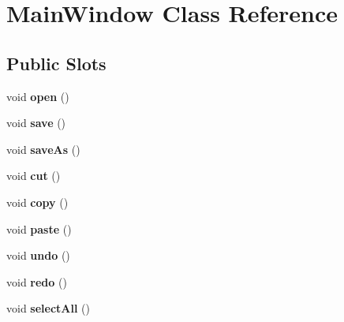 \hypertarget{class_main_window}{
\section{MainWindow Class Reference}
\label{class_main_window}
}
\subsection*{Public Slots}
\begin{DoxyCompactItemize}
\item 
\hypertarget{class_main_window_aa7473e4bbbcc281706ac2edef864fb45}{
void {\bfseries open} ()}
\label{class_main_window_aa7473e4bbbcc281706ac2edef864fb45}

\item 
\hypertarget{class_main_window_a3ba1a371fb10e731ae0926ae85efeb4f}{
void {\bfseries save} ()}
\label{class_main_window_a3ba1a371fb10e731ae0926ae85efeb4f}

\item 
\hypertarget{class_main_window_a7fbef0054cdec7bbbf3c06fb12af473c}{
void {\bfseries saveAs} ()}
\label{class_main_window_a7fbef0054cdec7bbbf3c06fb12af473c}

\item 
\hypertarget{class_main_window_a03fc263176d1b53aeaca24606c11a7b4}{
void {\bfseries cut} ()}
\label{class_main_window_a03fc263176d1b53aeaca24606c11a7b4}

\item 
\hypertarget{class_main_window_acf6d6b4fec2a84de7ec6645260c061fa}{
void {\bfseries copy} ()}
\label{class_main_window_acf6d6b4fec2a84de7ec6645260c061fa}

\item 
\hypertarget{class_main_window_a191360e5ede86ddbba4b18e50bba9a56}{
void {\bfseries paste} ()}
\label{class_main_window_a191360e5ede86ddbba4b18e50bba9a56}

\item 
\hypertarget{class_main_window_a7ed53c4e1d2bf9321ed5df917b55d40a}{
void {\bfseries undo} ()}
\label{class_main_window_a7ed53c4e1d2bf9321ed5df917b55d40a}

\item 
\hypertarget{class_main_window_a21b622c0f1855274d69f32421f10b251}{
void {\bfseries redo} ()}
\label{class_main_window_a21b622c0f1855274d69f32421f10b251}

\item 
\hypertarget{class_main_window_a595fd3f60139b137bf8b125d0f87f79f}{
void {\bfseries selectAll} ()}
\label{class_main_window_a595fd3f60139b137bf8b125d0f87f79f}


\end{DoxyCompactItemize}
